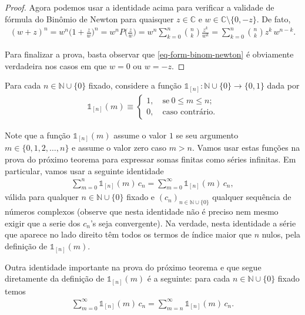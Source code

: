 \begin{proof}
Agora podemos usar a identidade acima para 
verificar a validade de fórmula do Binômio de Newton 
para quaisquer $z\in\mathbb{C}$ e 
$w\in\mathbb{C}\setminus\{0,-z\}$. De fato, 
\begin{align*}
(w+z)^n 
= 
w^n\Big(1+\frac{z}{w}\Big)^n 
= 
w^n 
P\Big(\frac{z}{w}\Big) = 
w^n
\sum_{k=0}^n \binom{n}{k}\frac{z^k}{w^k}
=
\sum_{k=0}^n \binom{n}{k}z^k\,w^{n-k}.
\end{align*}

Para finalizar a prova, basta observar que \eqref{eq-form-binom-newton}
é obviamente verdadeira nos casos em que $w=0$ ou $w=-z$.
\end{proof}

\bigskip

Para cada $n\in\mathbb{N}\cup\{0\}$ fixado, considere a função
$\mathds{1}_{[n]}:\mathbb{N}\cup\{0\}\to\{0,1\}$ dada por 
\begin{align}\label{eq-def-1mn}
\mathds{1}_{[n]}(m)
\equiv
\begin{cases}
1,\quad\text{se}\ 0\leqslant m\leqslant n;
\\[0.2cm]
0,\quad\text{caso contrário}.
\end{cases}
\end{align}

Note que a função $\mathds{1}_{[n]}(m)$ assume o valor $1$ se seu argumento  $m\in\{0,1,2,\ldots,n\}$ e assume o valor
zero caso $m>n$. 
Vamos usar estas funções na prova do próximo teorema para expressar somas finitas como 
séries infinitas. Em particular, vamos usar a seguinte identidade
\begin{align}\label{eq-aux1-indicadora-[m]}
\sum_{m=0}^n \mathds{1}_{[n]}(m)\, c_n = \sum_{m=0}^{\infty} \mathds{1}_{[n]}(m)\, c_n,
\end{align}
válida para qualquer $n\in\mathbb{N}\cup\{0\}$ fixado e $(c_n)_{n\in\mathbb{N}\cup\{0\}}$ qualquer sequência de números complexos
(observe que nesta identidade não é preciso nem mesmo 
exigir que a serie dos $c_n$'s seja convergente). 
Na verdade, 
nesta identidade a série que aparece no lado direito 
têm todos os termos de índice maior que $n$
nulos, pela definição de $\mathds{1}_{[n]}(m)$. 

Outra identidade importante na prova do próximo teorema 
e que segue diretamente da definição de $\mathds{1}_{[n]}(m)$ é a seguinte: 
para cada $n\in\mathbb{N}\cup\{0\}$ fixado temos
\begin{align}\label{eq-aux2-indicadora-[m]}
\sum_{m=0}^{\infty} 
\mathds{1}_{[n]}(m)\, c_n 
= 
\sum_{m=n}^{\infty} \mathds{1}_{[n]}(m)\, c_n.
\end{align}


